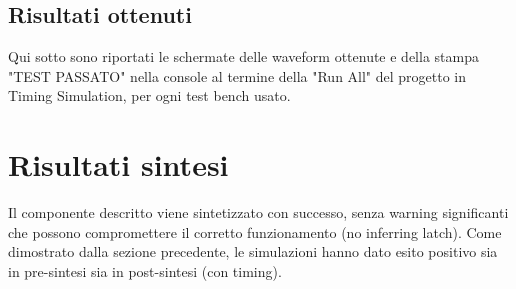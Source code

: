 \documentclass[a4paper,12pt]{article}
\begin{document}
\subsection{Risultati ottenuti}
Qui sotto sono riportati le schermate delle waveform ottenute e della stampa "TEST PASSATO" nella console al termine della "Run All" del progetto in Timing Simulation, per ogni test bench usato.

\section{Risultati sintesi}
Il componente descritto viene sintetizzato con successo, senza warning significanti che possono compromettere il corretto funzionamento (no inferring latch). Come dimostrato dalla sezione precedente, le simulazioni hanno dato esito positivo sia in pre-sintesi sia in post-sintesi (con timing).
\end{document}
